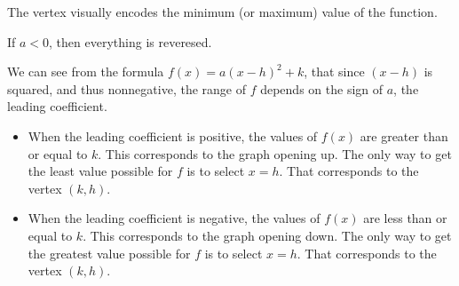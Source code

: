 \documentclass{ximera}
\begin{document}
The vertex visually encodes the  minimum (or maximum) value of the function. 




If $a<0$, then everything is reveresed.







\begin{image}
\end{image}











We can see from the formula $f(x) = a (x - h)^2 + k$, that since $(x - h)$ is squared, and thus nonnegative, the range of $f$ depends on the sign of $a$, the leading coefficient. \\


\begin{itemize}
     \item When the leading coefficient is positive, the values of $f(x)$ are greater than or equal to $k$. This corresponds to the graph opening up.  The only way to get the least value possible for $f$ is to select $x = h$. That corresponds to the vertex $(k, h)$. \\


     \item When the leading coefficient is negative, the values of $f(x)$ are less than or equal to $k$. This corresponds to the graph opening down.  The only way to get the greatest value possible for $f$ is to select $x = h$. That corresponds to the vertex $(k, h)$.  \\
\end{itemize}
\end{document}
